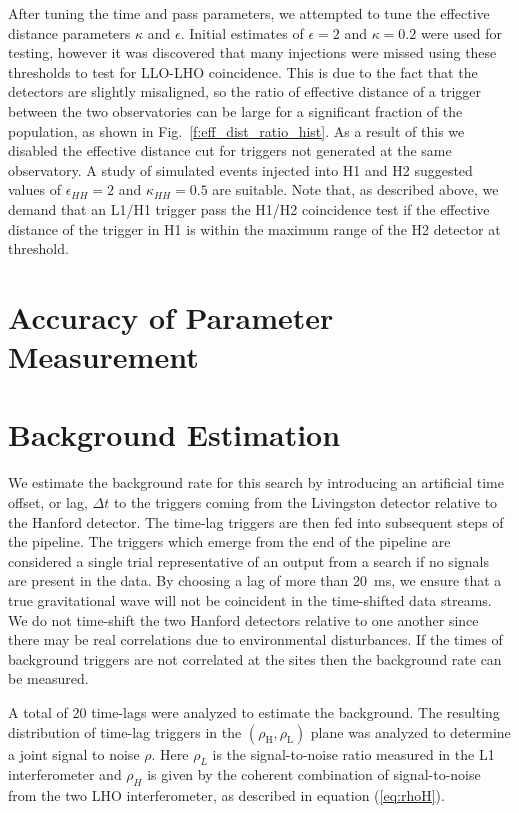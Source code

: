 After tuning the time and pass parameters, we attempted to tune the effective
distance parameters $\kappa$ and $\epsilon$. Initial estimates of $\epsilon =
2$ and $\kappa = 0.2$ were used for testing, however it was discovered that
many injections were missed using these thresholds to test for LLO-LHO
coincidence. This is due to the fact that the detectors are slightly
misaligned, so the ratio of effective distance of a trigger between the two
observatories can be large for a significant fraction of the population, as
shown in Fig.~\ref{f:eff_dist_ratio_hist}. As a result of this we disabled the
effective distance cut for triggers not generated at the same observatory.
A study of simulated events injected into H1 and H2 suggested values
of $\epsilon_{HH} = 2$ and $\kappa_{HH} = 0.5$ are suitable. Note
that, as described above, we demand that an
L1/H1 trigger pass the H1/H2 coincidence test if the effective distance of the
trigger in H1 is within the maximum range of the H2 detector at threshold.

\section{Accuracy of Parameter Measurement}
\label{ss:s2parameters}

\section{Background Estimation}
\label{s:s2background}

We estimate the background rate for this search by introducing an artificial
time offset, or {lag}, $\Delta t$ to the triggers coming from the Livingston
detector relative to the Hanford detector.  The time-lag triggers are then fed
into subsequent steps of the pipeline.  The triggers which emerge from the end
of the pipeline are considered a single trial representative of an output from
a search if no signals are present in the data.   By choosing a lag of more
than 20~ms, we ensure that a true gravitational wave will not be coincident in
the time-shifted data streams.  We do not time-shift the two Hanford detectors
relative to one another since there may be real correlations due to
environmental disturbances.  If the times of background triggers are not
correlated at the sites then the background rate can be measured.

A total of 20 time-lags were analyzed to estimate the background.  The
resulting distribution of time-lag triggers in the
$(\rho_{\mathrm{H}},\rho_{\mathrm{L}})$ plane was analyzed to determine a
joint signal to noise $\rho$.  Here $\rho_L$ is the signal-to-noise ratio
measured in the L1 interferometer and $\rho_H$ is given by the coherent
combination of signal-to-noise from the two LHO interferometer, as described
in equation (\ref{eq:rhoH}). 

